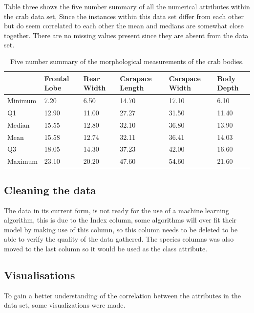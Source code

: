 \documentclass[
]{article}
\begin{document}
Table three shows the five number summary of all the numerical
attributes within the crab data set, Since the instances within this
data set differ from each other but do seem correlated to each other the
mean and medians are somewhat close together. There are no missing
values present since they are absent from the data set.

\begin{table}[!h]

\caption{\label{tab:Five number summary of the crab data}Five number summary of the morphological measurements of the crab bodies.}
\centering
\begin{tabular}[t]{l|l|l|l|l|l}
\hline
  & Frontal Lobe & Rear Width & Carapace Length & Carapace Width & Body Depth\\
\hline
Minimum & 7.20 & 6.50 & 14.70 & 17.10 & 6.10\\
\hline
Q1 & 12.90 & 11.00 & 27.27 & 31.50 & 11.40\\
\hline
Median & 15.55 & 12.80 & 32.10 & 36.80 & 13.90\\
\hline
Mean & 15.58 & 12.74 & 32.11 & 36.41 & 14.03\\
\hline
Q3 & 18.05 & 14.30 & 37.23 & 42.00 & 16.60\\
\hline
Maximum & 23.10 & 20.20 & 47.60 & 54.60 & 21.60\\
\hline
\end{tabular}
\end{table}

\hypertarget{cleaning-the-data}{%
\subsection{Cleaning the data}\label{cleaning-the-data}}

The data in its current form, is not ready for the use of a machine
learning algorithm, this is due to the Index column, some algorithms
will over fit their model by making use of this column, so this column
needs to be deleted to be able to verify the quality of the data
gathered. The species columns was also moved to the last column so it
would be used as the class attribute.

\hypertarget{visualisations}{%
\subsection{Visualisations}\label{visualisations}}

To gain a better understanding of the correlation between the attributes
in the data set, some visualizations were made.
\end{document}

